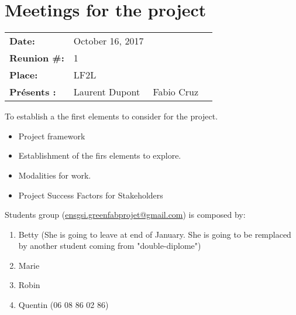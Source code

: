 \section{Meetings for the project}



\begin{tcolorbox}[
	title=Meeting 1 - From Green FabLab to FabCity,
	breakable,
	toptitle=3mm,
	colback=blue!5!white,
	colframe=blue!75!black,
	colbacktitle=blue!30,
	coltitle=blue!20!black,  
	fonttitle=\bfseries,
	subtitle style={boxrule=0.4pt,
		colback=blue!50!yellow!5!white} ]



\begin{flushleft}
	\begin{tabular}{l l l l}
		
		{\Large \textbf{Date:}}	& October 16, 2017 & &\\
		{\Large \textbf{Reunion \#: }} & 1 & & \\ 
		{\Large \textbf{Place: }} & LF2L & &\\ %
		{\Large \textbf{Présents : }}	& \tabitem Laurent Dupont& \tabitem Fabio Cruz  & \\		
	\end{tabular}
\end{flushleft}



	To establish a the first elements to consider for the project.

	\begin{itemize}
		\item Project framework
		\item Establishment of the firs elements to explore.
		\item Modalities for work.
		\item Project Success Factors for Stakeholders
	\end{itemize}


	Students group (\href{mailto:ensgsi.greenfabprojet@gmail.com}{ensgsi.greenfabprojet@gmail.com}) is composed by:
	\begin{enumerate}
		\item Betty (She is going to leave at end of January. She is going to be remplaced by another student coming from "double-diplome")
		\item Marie
		\item Robin 
		\item Quentin (06 08 86 02 86)
	\end{enumerate}



\end{tcolorbox}
